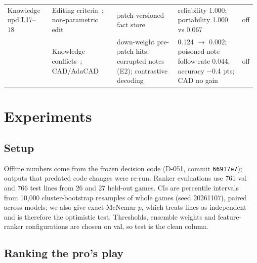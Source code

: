\documentclass[conference]{IEEEtran}
\newcommand{\tw}[1]{\texttt{#1}}
\begin{document}
\begin{table}[t]
\begin{tabular}{@{}L{2.0cm}L{4.1cm}L{4.95cm}L{5.0cm}l@{}}
Knowledge upd.\newline L17--18~\cite{lim2026l17,lim2026l18}
 & Editing criteria~\cite{yao2023editingsurvey}; non-parametric edit~\cite{mitchell2022serac} & patch-versioned fact store & reliability 1.000; portability 1.000 vs 0.067 & off\\
 & Knowledge conflicts~\cite{wu2024clasheval,xie2024chameleon}; CAD/AdaCAD~\cite{shi2024cad,wang2025adacad} & down-weight pre-patch hits; corrupted notes (E2); contrastive decoding & 0.124 $\rightarrow$ 0.002; poisoned-note follow-rate 0.044, accuracy $-$0.4 pts; CAD no gain & off\\
\bottomrule
\end{tabular}
\end{table}

\section{Experiments}
\label{sec:exp}

\subsection{Setup}
Offline numbers come from the frozen decision code (D-051, commit \tw{66917e7}); outputs that predated code changes were re-run. Ranker evaluations use 761 val and 766 test lines from 26 and 27 held-out games. CIs are percentile intervals from 10,000 cluster-bootstrap resamples of whole games (seed 20261107), paired across models; we also give exact McNemar $p$, which treats lines as independent and is therefore the optimistic test. Thresholds, ensemble weights and feature-ranker configurations are chosen on val, so test is the clean column. %

\subsection{Ranking the pro's play}
\label{sec:ranker}
\end{document}
